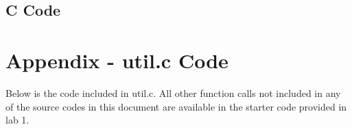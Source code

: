 \documentclass{article}
\begin{document}
\subsection{C Code}




\section{Appendix - util.c Code}
Below is the code included in util.c. All other function calls not included in any of the source codes in this document are available in the starter code provided in lab 1.

\end{document}
